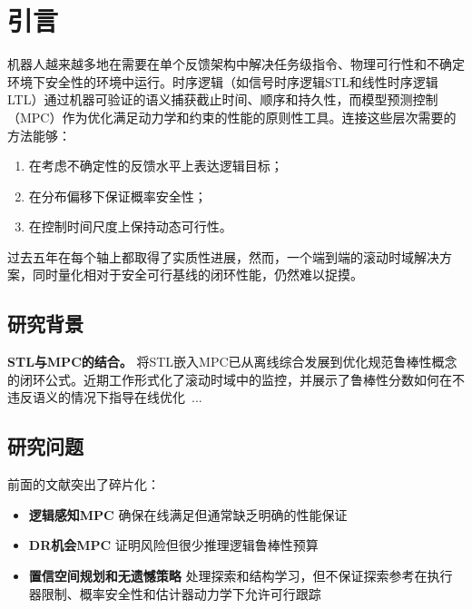 \documentclass[12pt,a4paper]{ctexart}
\numberwithin{equation}{section}
\begin{document}
\clearpage
\tableofcontents

\clearpage
\section{引言}

机器人越来越多地在需要在单个反馈架构中解决任务级指令、物理可行性和不确定环境下安全性的环境中运行。时序逻辑（如信号时序逻辑STL和线性时序逻辑LTL）通过机器可验证的语义捕获截止时间、顺序和持久性，而模型预测控制（MPC）作为优化满足动力学和约束的性能的原则性工具。连接这些层次需要的方法能够：

\begin{enumerate}[label=(\arabic*)]
    \item 在考虑不确定性的反馈水平上表达逻辑目标；
    \item 在分布偏移下保证概率安全性；
    \item 在控制时间尺度上保持动态可行性。
\end{enumerate}

过去五年在每个轴上都取得了实质性进展，然而，一个端到端的滚动时域解决方案，同时量化相对于安全可行基线的闭环性能，仍然难以捉摸。

\subsection{研究背景}

\textbf{STL与MPC的结合。} 将STL嵌入MPC已从离线综合发展到优化规范鲁棒性概念的闭环公式。近期工作形式化了滚动时域中的监控，并展示了鲁棒性分数如何在不违反语义的情况下指导在线优化~\cite{Yu2024Automatica_STL_MPM}...

\subsection{研究问题}

前面的文献突出了碎片化：

\begin{itemize}
    \item \textbf{逻辑感知MPC} 确保在线满足但通常缺乏明确的性能保证
    \item \textbf{DR机会MPC} 证明风险但很少推理逻辑鲁棒性预算
    \item \textbf{置信空间规划和无遗憾策略} 处理探索和结构学习，但不保证探索参考在执行器限制、概率安全性和估计器动力学下允许可行跟踪
\end{itemize}
\end{document}
